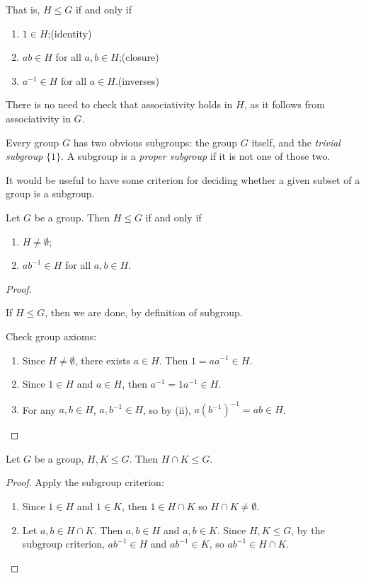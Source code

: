 That is, $H\le G$ if and only if
\begin{enumerate}[label=(\roman*)]
\item $1\in H$;\hfill(identity)
\item $ab\in H$ for all $a,b\in H$;\hfill(closure)
\item $a^{-1}\in H$ for all $a\in H$.\hfill(inverses)
\end{enumerate}

\begin{remark}
There is no need to check that associativity holds in $H$, as it follows from associativity in $G$.
\end{remark}

Every group $G$ has two obvious subgroups: the group $G$ itself, and the \emph{trivial subgroup} $\{1\}$. A subgroup is a \emph{proper subgroup} if it is not one of those two.

It would be useful to have some criterion for deciding whether a given subset of a group is a subgroup.

\begin{lemma}
Let $G$ be a group. Then $H\le G$ if and only if
\begin{enumerate}[label=(\roman*)]
\item $H\neq\emptyset$;
\item $ab^{-1}\in H$ for all $a,b\in H$. 
\end{enumerate}
\end{lemma}

\begin{proof} \

\fbox{$\implies$} If $H\le G$, then we are done, by definition of subgroup.

\fbox{$\impliedby$} Check group axioms:
\begin{enumerate}[label=(\roman*)]
\item Since $H\neq\emptyset$, there exists $a\in H$. Then $1=aa^{-1}\in H$.
\item Since $1\in H$ and $a\in H$, then $a^{-1}=1a^{-1}\in H$.
\item For any $a,b\in H$, $a,b^{-1}\in H$, so by (ii), $a(b^{-1})^{-1}=ab\in H$.
\end{enumerate}
\end{proof}

\begin{proposition}
Let $G$ be a group, $H,K\le G$. Then $H\cap K\le G$.
\end{proposition}

\begin{proof}
Apply the subgroup criterion:
\begin{enumerate}[label=(\roman*)]
\item Since $1\in H$ and $1\in K$, then $1\in H\cap K$ so $H\cap K\neq\emptyset$.
\item Let $a,b\in H\cap K$. Then $a,b\in H$ and $a,b\in K$. Since $H,K\le G$, by the subgroup criterion, $ab^{-1}\in H$ and $ab^{-1}\in K$, so $ab^{-1}\in H\cap K$.
\end{enumerate}
\end{proof}

